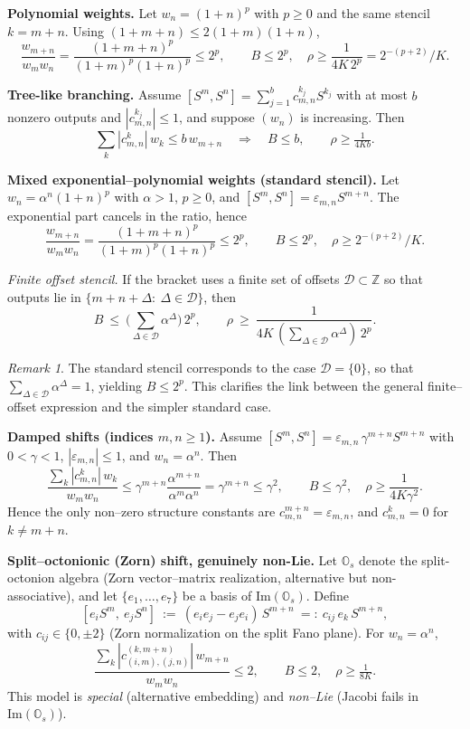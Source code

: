 \documentclass[11pt]{amsart}
\numberwithin{equation}{section}
\theoremstyle{remark}
\newtheorem{remark}[theorem]{Remark}
\begin{document}
\smallskip
\noindent\textbf{Polynomial weights.}
Let $w_n=(1+n)^p$ with $p\ge 0$ and the same stencil $k=m+n$. Using $(1+m+n)\le 2(1+m)(1+n)$,
\[
\frac{w_{m+n}}{w_mw_n}=\frac{(1+m+n)^p}{(1+m)^p(1+n)^p}\le 2^p,
\qquad B\le 2^p,\quad \rho\ge \frac{1}{4K\,2^p}=2^{-(p+2)}/K.
\]

\smallskip
\noindent\textbf{Tree-like branching.}
Assume $[S^m,S^n]=\sum_{j=1}^{b} c_{m,n}^{k_j} S^{k_j}$ with at most $b$ nonzero outputs and $|c_{m,n}^{k_j}|\le 1$, and suppose $(w_n)$ is increasing. Then
\[
\sum_k |c_{m,n}^k|\,w_k \le b\, w_{m+n}\quad\Rightarrow\quad B\le b,\qquad \rho\ge \tfrac{1}{4Kb}.
\]

\smallskip
\noindent\textbf{Mixed exponential--polynomial weights (standard stencil).}
Let $w_n=\alpha^n(1+n)^p$ with $\alpha>1$, $p\ge 0$, and $[S^m,S^n]=\varepsilon_{m,n}S^{m+n}$. The exponential part cancels in the ratio, hence
\[
\frac{w_{m+n}}{w_mw_n}=\frac{(1+m+n)^p}{(1+m)^p(1+n)^p}\le 2^p,
\qquad B\le 2^p,\quad \rho\ge 2^{-(p+2)}/K.
\]

\emph{Finite offset stencil.} If the bracket uses a finite set of offsets $\mathcal D\subset\mathbb Z$ so that outputs lie in $\{m+n+\Delta:\ \Delta\in\mathcal D\}$, then
\[
B\ \le\ \Big(\sum_{\Delta\in\mathcal D}\alpha^{\Delta}\Big)\, 2^p,
\qquad
\rho\ \ge\ \frac{1}{4K\,(\sum_{\Delta\in\mathcal D}\alpha^{\Delta})\,2^p}.
\]

\begin{remark}
The standard stencil corresponds to the case $\mathcal D=\{0\}$, so that
$\sum_{\Delta\in\mathcal D}\alpha^\Delta=1$, yielding $B\le 2^p$.
This clarifies the link between the general finite--offset expression
and the simpler standard case.
\end{remark}

\smallskip
\noindent\textbf{Damped shifts (indices $m,n\ge 1$).}
Assume $[S^m,S^n]=\varepsilon_{m,n}\,\gamma^{m+n} S^{m+n}$ with $0<\gamma<1$, $|\varepsilon_{m,n}|\le 1$, and $w_n=\alpha^n$. Then
\[
\frac{\sum_k |c_{m,n}^k|\,w_k}{w_m w_n}\le \gamma^{m+n}\frac{\alpha^{m+n}}{\alpha^m\alpha^n}=\gamma^{m+n}\le \gamma^2,
\qquad
B\le \gamma^2,\quad \rho\ge \frac{1}{4K\gamma^2}.
\]
Hence the only non--zero structure constants are $c^{m+n}_{m,n} = \varepsilon_{m,n}$, and $c^k_{m,n} = 0$ for $k \ne m+n$.

\smallskip
\noindent\textbf{Split--octonionic (Zorn) shift, genuinely non-Lie.}
Let $\mathbb{O}_s$ denote the split-octonion algebra (Zorn vector–matrix realization, alternative but non-associative), and let $\{e_1,\dots,e_7\}$ be a basis of $\mathrm{Im}(\mathbb{O}_s)$. Define
\[
[e_i S^m,\ e_j S^n]\ :=\ (e_ie_j-e_je_i)\,S^{m+n}\ =:\ c_{ij}\,e_k\,S^{m+n},
\]
with $c_{ij}\in\{0,\pm 2\}$ (Zorn normalization on the split Fano plane). For $w_n=\alpha^n$,
\[
\frac{\sum_k |c_{(i,m),(j,n)}^{(k,m+n)}|\,w_{m+n}}{w_m w_n}\le 2,
\qquad
B\le 2,\quad \rho\ge \tfrac{1}{8K}.
\]
This model is \emph{special} (alternative embedding) and \emph{non--Lie} (Jacobi fails in $\mathrm{Im}(\mathbb{O}_s)$).
\end{document}
